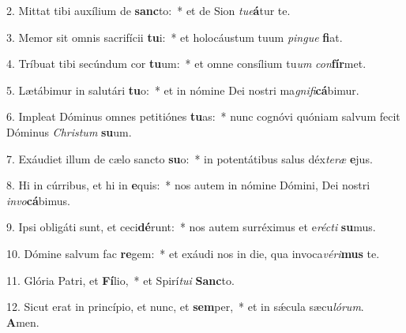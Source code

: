 2. Mittat tibi auxílium de \textbf{sanc}to:~*  et de Sion \textit{tu}\textit{e}\textbf{á}tur te.\

3. Memor sit omnis sacrifícii \textbf{tu}i:~*  et holocáustum tuum \textit{pin}\textit{gue} \textbf{fi}at.\

4. Tríbuat tibi secúndum cor \textbf{tu}um:~*  et omne consílium tu\textit{um} \textit{con}\textbf{fír}met.\

5. Lætábimur in salutári \textbf{tu}o:~*  et in nómine Dei nostri ma\textit{gni}\textit{fi}\textbf{cá}bimur.\

6. Impleat Dóminus omnes petitiónes \textbf{tu}as:~*  nunc cognóvi quóniam salvum fecit Dóminus \textit{Chris}\textit{tum} \textbf{su}um.\

7. Exáudiet illum de cælo sancto \textbf{su}o:~*  in potentátibus salus déx\textit{te}\textit{ræ} \textbf{e}jus.\

8. Hi in cúrribus, et hi in \textbf{e}quis:~*  nos autem in nómine Dómini, Dei nostri \textit{in}\textit{vo}\textbf{cá}bimus.\

9. Ipsi obligáti sunt, et ceci\textbf{dé}runt:~*  nos autem surréximus et e\textit{réc}\textit{ti} \textbf{su}mus.\

10. Dómine salvum fac \textbf{re}gem:~*  et exáudi nos in die, qua invoca\textit{vé}\textit{ri}\textbf{mus} te.\

11. Glória Patri, et \textbf{Fí}lio,~*  et Spirí\textit{tu}\textit{i} \textbf{Sanc}to.\

12. Sicut erat in princípio, et nunc, et \textbf{sem}per,~*  et in sǽcula sæcu\textit{ló}\textit{rum}. \textbf{A}men.\

